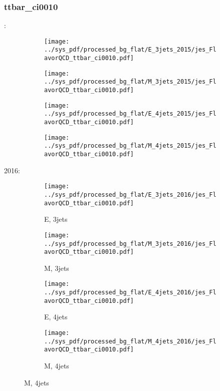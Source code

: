 \documentclass{beamer}
\begin{document}
\begin{frame}
\frametitle{ttbar_ci0010}
\fontsize{5}{1}:
\begin{figure}
\centering
\begin{subfigure}[b]{0.24\textwidth}
\texttt{[image: ../sys\_pdf/processed\_bg\_flat/E\_3jets\_2015/jes\_FlavorQCD\_ttbar\_ci0010.pdf]}
\end{subfigure}
\begin{subfigure}[b]{0.24\textwidth}
\texttt{[image: ../sys\_pdf/processed\_bg\_flat/M\_3jets\_2015/jes\_FlavorQCD\_ttbar\_ci0010.pdf]}
\end{subfigure}
\begin{subfigure}[b]{0.24\textwidth}
\texttt{[image: ../sys\_pdf/processed\_bg\_flat/E\_4jets\_2015/jes\_FlavorQCD\_ttbar\_ci0010.pdf]}
\end{subfigure}
\begin{subfigure}[b]{0.24\textwidth}
\texttt{[image: ../sys\_pdf/processed\_bg\_flat/M\_4jets\_2015/jes\_FlavorQCD\_ttbar\_ci0010.pdf]}
\end{subfigure}
\end{figure}
2016:
\begin{figure}
\centering
\begin{subfigure}[b]{0.24\textwidth}
\texttt{[image: ../sys\_pdf/processed\_bg\_flat/E\_3jets\_2016/jes\_FlavorQCD\_ttbar\_ci0010.pdf]}
\captionsetup{font=tiny}
\caption{E, 3jets}
\end{subfigure}
\begin{subfigure}[b]{0.24\textwidth}
\texttt{[image: ../sys\_pdf/processed\_bg\_flat/M\_3jets\_2016/jes\_FlavorQCD\_ttbar\_ci0010.pdf]}
\captionsetup{font=tiny}
\caption{M, 3jets}
\end{subfigure}
\begin{subfigure}[b]{0.24\textwidth}
\texttt{[image: ../sys\_pdf/processed\_bg\_flat/E\_4jets\_2016/jes\_FlavorQCD\_ttbar\_ci0010.pdf]}
\captionsetup{font=tiny}
\caption{E, 4jets}
\end{subfigure}
\begin{subfigure}[b]{0.24\textwidth}
\texttt{[image: ../sys\_pdf/processed\_bg\_flat/M\_4jets\_2016/jes\_FlavorQCD\_ttbar\_ci0010.pdf]}
\captionsetup{font=tiny}
\caption{M, 4jets}
\end{subfigure}
\end{figure}
\end{frame}
\end{document}
